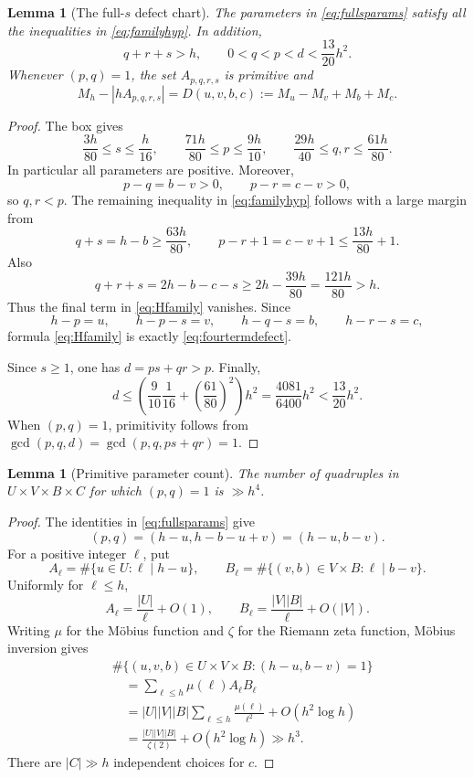 \documentclass[11pt,reqno]{amsart}
\newtheorem{lemma}[theorem]{Lemma}
\theoremstyle{definition}
\theoremstyle{remark}
\begin{document}
\begin{lemma}[The full-$s$ defect chart]\label{lem:fullschart}
The parameters in \eqref{eq:fullsparams} satisfy all the inequalities in
\eqref{eq:familyhyp}.  In addition,
\[
 q+r+s>h,
 \qquad 0<q<p<d<\frac{13}{20}h^2.
\]
Whenever $(p,q)=1$, the set $A_{p,q,r,s}$ is primitive and
\begin{equation}\label{eq:fourtermdefect}
 M_h-|hA_{p,q,r,s}|=D(u,v,b,c):=M_u-M_v+M_b+M_c.
\end{equation}
\end{lemma}

\begin{proof}
The box gives
\begin{equation}\label{eq:parameterbounds}
 \frac{3h}{80}\leq s\leq\frac h{16},\qquad
 \frac{71h}{80}\leq p\leq\frac{9h}{10},\qquad
 \frac{29h}{40}\leq q,r\leq\frac{61h}{80}.
\end{equation}
In particular all parameters are positive.  Moreover,
\[
 p-q=b-v>0,\qquad p-r=c-v>0,
\]
so $q,r<p$.  The remaining inequality in \eqref{eq:familyhyp} follows
with a large margin from
\[
 q+s=h-b\geq\frac{63h}{80},\qquad
 p-r+1=c-v+1\leq\frac{13h}{80}+1.
\]
Also
\[
 q+r+s=2h-b-c-s
 \geq2h-\frac{39h}{80}=\frac{121h}{80}>h.
\]
Thus the final term in \eqref{eq:Hfamily} vanishes.  Since
\[
 h-p=u,\qquad h-p-s=v,\qquad h-q-s=b,\qquad h-r-s=c,
\]
formula \eqref{eq:Hfamily} is exactly \eqref{eq:fourtermdefect}.

Since $s\geq1$, one has $d=ps+qr>p$.  Finally,
\[
 d\leq\left(\frac9{10}\frac1{16}
       +\left(\frac{61}{80}\right)^2\right)h^2
 =\frac{4081}{6400}h^2<\frac{13}{20}h^2.
\]
When $(p,q)=1$, primitivity follows from
$\gcd(p,q,d)=\gcd(p,q,ps+qr)=1$.
\end{proof}

\begin{lemma}[Primitive parameter count]\label{lem:fullsprimitive}
The number of quadruples in $U\times V\times B\times C$ for which
$(p,q)=1$ is $\gg h^4$.
\end{lemma}

\begin{proof}
The identities in \eqref{eq:fullsparams} give
\begin{equation}\label{eq:gcdrewrite}
 (p,q)=(h-u,h-b-u+v)=(h-u,b-v).
\end{equation}
For a positive integer $\ell$, put
\[
 A_\ell=\#\{u\in U:\ell\mid h-u\},\qquad
 B_\ell=\#\{(v,b)\in V\times B:\ell\mid b-v\}.
\]
Uniformly for $\ell\leq h$,
\[
 A_\ell=\frac{|U|}{\ell}+O(1),\qquad
 B_\ell=\frac{|V||B|}{\ell}+O(|V|).
\]
Writing $\mu$ for the M\"obius function and $\zeta$ for the Riemann zeta
function, M\"obius inversion gives
\begin{align*}
 &\#\{(u,v,b)\in U\times V\times B:(h-u,b-v)=1\}\\
 &\quad=\sum_{\ell\leq h}\mu(\ell)A_\ell B_\ell\\
 &\quad=|U||V||B|\sum_{\ell\leq h}\frac{\mu(\ell)}{\ell^2}
       +O(h^2\log h)\\
 &\quad=\frac{|U||V||B|}{\zeta(2)}+O(h^2\log h)
 \gg h^3.
\end{align*}
There are $|C|\gg h$ independent choices for $c$.
\end{proof}
\end{document}
